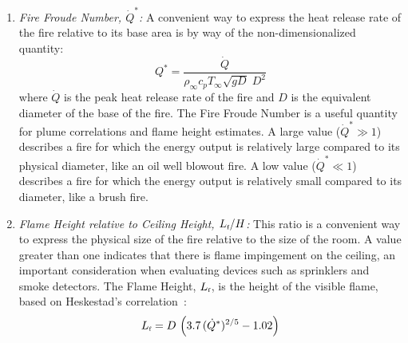 \documentclass[graybox]{svmult}
\begin{document}
\begin{enumerate}
\item {\em Fire Froude Number, $\dot{Q}^*$:}
A convenient way to express the heat release rate of the fire relative to its base area is by way of the non-dimensionalized quantity:
\begin{equation}
 Q^* = \frac{\dot{Q}}{\rho_\infty c_p T_\infty \sqrt{gD} \; D^2}
\end{equation}
where $\dot{Q}$ is the peak heat release rate of the fire and $D$ is the equivalent diameter of the base of the fire.
The Fire Froude Number is a useful quantity for plume correlations and flame height estimates. A large value ($\dot{Q}^* \gg 1$) describes a fire for which the energy output is relatively large compared to its physical diameter, like an oil well blowout fire.  A low value ($\dot{Q}^* \ll 1$) describes a fire for which the energy output is relatively small compared to its diameter, like a brush fire.

\item {\em Flame Height relative to Ceiling Height, $L_{\hbox{\tiny f}}/H$:}
This ratio is a convenient way to express the physical size of the fire relative to the size of the room. A value greater than
one indicates that there is flame impingement on the ceiling, an important consideration when evaluating devices such as sprinklers and smoke detectors.
The Flame Height, $L_{\hbox{\tiny f}}$, is the height of the visible flame, based on Heskestad's correlation~\cite{Heskestad:FSJ1983}:
\begin{equation}
   L_{\hbox{\tiny f}} = D \, \left( 3.7 \, (\dot{Q}^*)^{2/5} - 1.02 \right) \label{Heskestad_Flame_Height}
\end{equation}


\end{enumerate}
\end{document}

